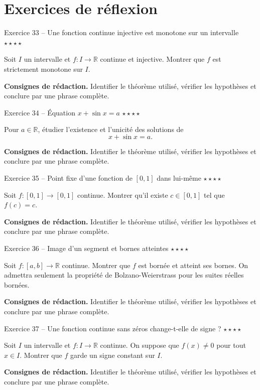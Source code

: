 \documentclass[11pt,a4paper]{article}
\newcommand{\etoiles}[1]{\hfill\textcolor{orangeprepa}{\textbf{#1}}}
\newcommand{\R}{\mathbb{R}}
\begin{document}
\section{Exercices de réflexion}
\begin{exobox}{Exercice 33 -- Une fonction continue injective est monotone sur un intervalle \etoiles{$\star\star\star\star$}}

Soit $I$ un intervalle et $f:I\to\R$ continue et injective. Montrer que $f$ est strictement monotone sur $I$.

\medskip
\textbf{Consignes de rédaction.} Identifier le théorème utilisé, vérifier les hypothèses et conclure par une phrase complète.
\end{exobox}


\begin{exobox}{Exercice 34 -- Équation $x+\sin x=a$ \etoiles{$\star\star\star\star$}}

Pour $a\in\R$, étudier l'existence et l'unicité des solutions de
\[
x+\sin x=a.
\]

\medskip
\textbf{Consignes de rédaction.} Identifier le théorème utilisé, vérifier les hypothèses et conclure par une phrase complète.
\end{exobox}


\begin{exobox}{Exercice 35 -- Point fixe d'une fonction de $[0,1]$ dans lui-même \etoiles{$\star\star\star\star$}}

Soit $f:[0,1]\to[0,1]$ continue. Montrer qu'il existe $c\in[0,1]$ tel que $f(c)=c$.

\medskip
\textbf{Consignes de rédaction.} Identifier le théorème utilisé, vérifier les hypothèses et conclure par une phrase complète.
\end{exobox}


\begin{exobox}{Exercice 36 -- Image d'un segment et bornes atteintes \etoiles{$\star\star\star\star$}}

Soit $f:[a,b]\to\R$ continue. Montrer que $f$ est bornée et atteint ses bornes. On admettra seulement la propriété de Bolzano-Weierstrass pour les suites réelles bornées.

\medskip
\textbf{Consignes de rédaction.} Identifier le théorème utilisé, vérifier les hypothèses et conclure par une phrase complète.
\end{exobox}


\begin{exobox}{Exercice 37 -- Une fonction continue sans zéros change-t-elle de signe ? \etoiles{$\star\star\star\star$}}

Soit $I$ un intervalle et $f:I\to\R$ continue. On suppose que $f(x)\neq0$ pour tout $x\in I$. Montrer que $f$ garde un signe constant sur $I$.

\medskip
\textbf{Consignes de rédaction.} Identifier le théorème utilisé, vérifier les hypothèses et conclure par une phrase complète.
\end{exobox}
\end{document}
